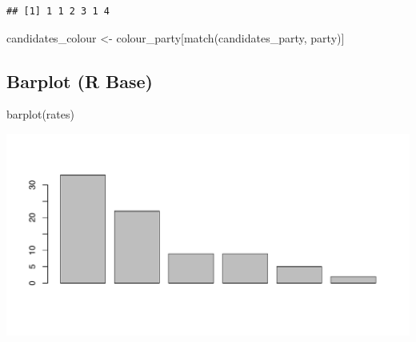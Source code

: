 \documentclass[
]{article}
\newenvironment{Shaded}{}{}
\newcommand{\FunctionTok}[1]{\textcolor[rgb]{0.02,0.16,0.49}{#1}}
\newcommand{\NormalTok}[1]{#1}
\newcommand{\OtherTok}[1]{\textcolor[rgb]{0.00,0.44,0.13}{#1}}
\begin{document}
\begin{verbatim}
## [1] 1 1 2 3 1 4
\end{verbatim}

\begin{Shaded}
\begin{Highlighting}[]
\NormalTok{candidates\_colour }\OtherTok{\textless{}{-}}\NormalTok{ colour\_party[}\FunctionTok{match}\NormalTok{(candidates\_party, party)]}
\end{Highlighting}
\end{Shaded}

\subsection{Barplot (R Base)}\label{barplot-r-base}

\begin{Shaded}
\begin{Highlighting}[]
\FunctionTok{barplot}\NormalTok{(rates)}
\end{Highlighting}
\end{Shaded}

\includegraphics{poll_JTBC_1702_pdf_files/figure-latex/unnamed-chunk-2-1.pdf}
\end{document}
